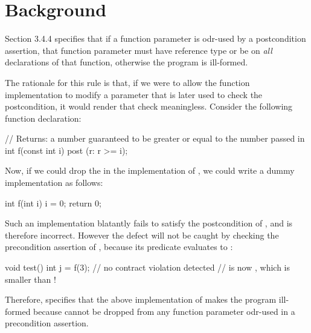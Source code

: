 





\section{Background}
\label{bg}

\cite{P2900R10} Section 3.4.4 specifies that if a function parameter is odr-used by a postcondition assertion, that function parameter must have reference type or be  on \emph{all} declarations of that function, otherwise the program is ill-formed.

The rationale for this rule is that, if we were to allow the function implementation to modify a parameter that is later used to check the postcondition, it would render that check meaningless. Consider the following function declaration:
\begin{codeblock}
// Returns: a number guaranteed to be greater or equal to the number passed in
int f(const int i) post (r: r >= i);
\end{codeblock}
Now, if we could drop the  in the implementation of , we could write a dummy implementation as follows:
\begin{codeblock}
int f(int i) {
  i = 0;
  return 0;
}
\end{codeblock}
Such an implementation blatantly fails to satisfy the postcondition of , and is therefore incorrect. However the defect will not be caught by checking the precondition assertion of , because its predicate evaluates to :
\begin{codeblock}
void test() {
  int j = f(3); // no contract violation detected
  //  is now , which is smaller than !
}
\end{codeblock}
Therefore, \cite{P2900R10} specifies that the above implementation of  makes the program ill-formed because  cannot be dropped from any function parameter odr-used in a precondition assertion.

